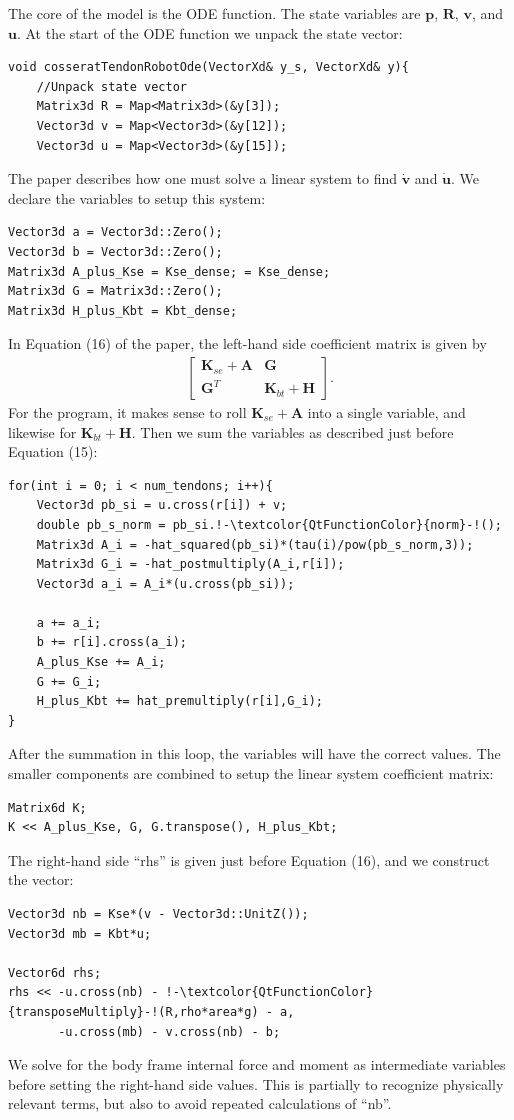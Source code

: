 \documentclass[12pt]{article}
\begin{document}
The core of the model is the ODE function. The state variables are $\boldsymbol{p}$, $\boldsymbol{R}$, $\boldsymbol{v}$, and $\boldsymbol{u}$. At the start of the ODE function we unpack the state vector:
\newpage
\begin{lstlisting}
void cosseratTendonRobotOde(VectorXd& y_s, VectorXd& y){
    //Unpack state vector
    Matrix3d R = Map<Matrix3d>(&y[3]);
    Vector3d v = Map<Vector3d>(&y[12]);
    Vector3d u = Map<Vector3d>(&y[15]);
\end{lstlisting}
The paper describes how one must solve a linear system to find $\dot{\boldsymbol{v}}$ and $\dot{\boldsymbol{u}}$. We declare the variables to setup this system:
\begin{lstlisting}
Vector3d a = Vector3d::Zero();
Vector3d b = Vector3d::Zero();
Matrix3d A_plus_Kse = Kse_dense; = Kse_dense;
Matrix3d G = Matrix3d::Zero();
Matrix3d H_plus_Kbt = Kbt_dense;
\end{lstlisting}
In Equation (16) of the paper, the left-hand side coefficient matrix is given by
\begin{align*}
\begin{bmatrix}
\boldsymbol{K}_{se} + \boldsymbol{A} & \boldsymbol{G} \\ \boldsymbol{G}^T & \boldsymbol{K}_{bt} + \boldsymbol{H}
\end{bmatrix}.
\end{align*}
For the program, it makes sense to roll $\boldsymbol{K}_{se} + \boldsymbol{A}$ into a single variable, and likewise for $\boldsymbol{K}_{bt} + \boldsymbol{H}$. Then we sum the variables as described just before Equation (15):
\begin{lstlisting}
for(int i = 0; i < num_tendons; i++){
    Vector3d pb_si = u.cross(r[i]) + v;
    double pb_s_norm = pb_si.!-\textcolor{QtFunctionColor}{norm}-!();
    Matrix3d A_i = -hat_squared(pb_si)*(tau(i)/pow(pb_s_norm,3));
    Matrix3d G_i = -hat_postmultiply(A_i,r[i]);
    Vector3d a_i = A_i*(u.cross(pb_si));

    a += a_i;
    b += r[i].cross(a_i);
    A_plus_Kse += A_i;
    G += G_i;
    H_plus_Kbt += hat_premultiply(r[i],G_i);
}
\end{lstlisting}
After the summation in this loop, the variables will have the correct values. The smaller components are combined to setup the linear system coefficient matrix:
\begin{lstlisting}
Matrix6d K;
K << A_plus_Kse, G, G.transpose(), H_plus_Kbt;
\end{lstlisting}
The right-hand side ``rhs'' is given just before Equation (16), and we construct the vector:
\begin{lstlisting}
Vector3d nb = Kse*(v - Vector3d::UnitZ());
Vector3d mb = Kbt*u;

Vector6d rhs;
rhs << -u.cross(nb) - !-\textcolor{QtFunctionColor}{transposeMultiply}-!(R,rho*area*g) - a,
       -u.cross(mb) - v.cross(nb) - b;
\end{lstlisting}
We solve for the body frame internal force and moment as intermediate variables before setting the right-hand side values. This is partially to recognize physically relevant terms, but also to avoid repeated calculations of ``nb''.
\end{document}
